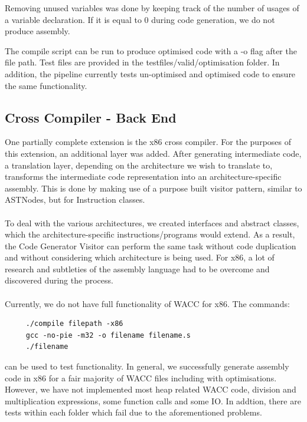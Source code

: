 \documentclass[5pt]{article}
\begin{document}
Removing unused variables was done by keeping track of the number of usages of a variable declaration. If it is equal to 0 during code generation, we do not produce assembly.

 The compile script can be run to produce optimised code with a -o flag after the file path. Test files are provided in the testfiles/valid/optimisation folder. In addition, the pipeline currently tests un-optimised and optimised code to ensure the same functionality.
 \subsection{Cross Compiler - Back End}
 One partially complete extension is the x86 cross compiler. For the purposes of this extension, an additional layer was added. After generating intermediate code, a translation layer, depending on the architecture we wish to translate to, transforms the intermediate code representation into an architecture-specific assembly. This is done by making use of a purpose built visitor pattern, similar to ASTNodes, but for Instruction classes.
 \\ \\
 To deal with the various architectures, we created interfaces and abstract classes, which the architecture-specific instructions/programs would extend. As a result, the Code Generator Visitor can perform the same task without code duplication and without considering which architecture is being used. For x86, a lot of research and subtleties of the assembly language had to be overcome and discovered during the process.
 \\ \\
Currently, we do not have full functionality of WACC for x86. The commands:
 \begin{lstlisting}
     ./compile filepath -x86
     gcc -no-pie -m32 -o filename filename.s
     ./filename
 \end{lstlisting}
 can be used to test functionality. In general, we successfully generate assembly code in x86 for a fair majority of WACC files including with optimisations. However, we have not implemented most heap related WACC code, division and multiplication expressions, some function calls and some IO. In addtion, there are tests within each folder which fail due to the aforementioned problems.
\end{document}
